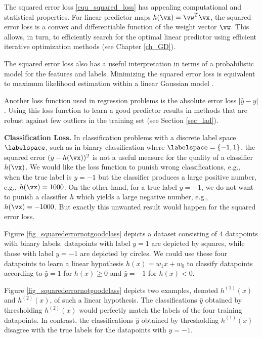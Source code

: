 \documentclass[12pt]{report}
\begin{document}
The squared error loss \eqref{equ_squared_loss} has appealing 
computational and statistical properties. For linear predictor 
maps $h(\vx) = \vw^{T} \vx$, the squared error loss is a 
convex and differentiable function of the weight vector $\vw$. 
This allows, in turn, to efficiently search for the optimal linear 
predictor using efficient iterative optimization methods (see Chapter \ref{ch_GD}). 

The squared error loss also has a useful interpretation in 
terms of a probabilistic model for the features and labels. 
Minimizing the squared error loss is equivalent to maximum 
likelihood estimation within a linear Gaussian model \cite[Sec. 2.6.3]{hastie01statisticallearning}. 

Another loss function used in regression problems is the absolute 
error loss $|\hat{y} - y|$. Using this loss function to learn a good 
predictor results in methods that are robust against few outliers in 
the training set (see Section \ref{sec_lad}).  

{\bf Classification Loss.} In classification problems with a 
discrete label space $\labelspace$, such as in binary classification 
where $\labelspace = \{-1,1\}$, the squared error $(y - h(\vx))^2$ 
is not a useful measure for the quality of a classifier $h(\vx)$. 
We would like the loss function to punish wrong classifications, 
e.g., when the true label is $y=-1$ but the classifier produces a 
large positive number, e.g., $h(\vx) = 1000$. On the other hand, 
for a true label $y=-1$, we do not want to punish a classifier $h$ 
which yields a large negative number, e.g., $h(\vx) = -1000$. But 
exactly this unwanted result would happen for the squared error 
loss. 

Figure \ref{fig_squarederrornotgoodclass} depicts a dataset 
consisting of $4$ datapoints with binary labels. datapoints 
with label $y=1$ are depicted by squares, while those with label 
$y=-1$ are depicted by circles. We could use these four datapoints 
to learn a linear hypothesis $h(x) = w_{1} x + w_{0}$ to classify 
datapoints according to $\hat{y} = 1$ for $h(x) \geq 0$ and 
$\hat{y}=-1$ for $h(x) < 0$. 

Figure \ref{fig_squarederrornotgoodclass} depicts two examples, 
denoted $h^{(1)}(x)$ and $h^{(2)}(x)$, of such a linear hypothesis. 
The classifications $\hat{y}$ obtained by thresholding $h^{(2)}(x)$ would 
perfectly match the labels of the four training datapoints. In 
contrast, the classifications $\hat{y}$ obtained by thresholding 
$h^{(1)}(x)$ disagree with the true labels for the datapoints 
with $y=-1$. 
\end{document}
